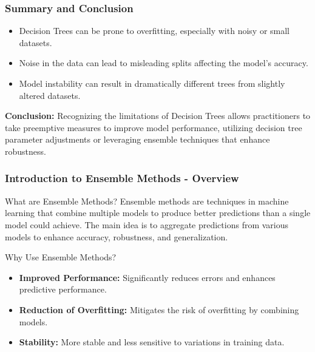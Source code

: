 \documentclass{beamer}
\begin{document}
\begin{frame}[fragile]
    \frametitle{Summary and Conclusion}
    \begin{itemize}
        \item Decision Trees can be prone to overfitting, especially with noisy or small datasets.
        \item Noise in the data can lead to misleading splits affecting the model's accuracy.
        \item Model instability can result in dramatically different trees from slightly altered datasets.
    \end{itemize}
    
    \textbf{Conclusion:} Recognizing the limitations of Decision Trees allows practitioners to take preemptive measures to improve model performance, utilizing decision tree parameter adjustments or leveraging ensemble techniques that enhance robustness.
\end{frame}

\begin{frame}[fragile]
    \frametitle{Introduction to Ensemble Methods - Overview}
    \begin{block}{What are Ensemble Methods?}
        Ensemble methods are techniques in machine learning that combine multiple models to produce better predictions than a single model could achieve. The main idea is to aggregate predictions from various models to enhance accuracy, robustness, and generalization.
    \end{block}

    \begin{block}{Why Use Ensemble Methods?}
        \begin{itemize}
            \item \textbf{Improved Performance:} Significantly reduces errors and enhances predictive performance.
            \item \textbf{Reduction of Overfitting:} Mitigates the risk of overfitting by combining models.
            \item \textbf{Stability:} More stable and less sensitive to variations in training data.
        \end{itemize}
    \end{block}
\end{frame}
\end{document}

